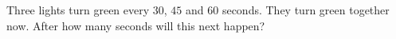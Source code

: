 Three lights turn green every $30$, $45$ and $60$ seconds. They turn green together now. After how many seconds will this next happen?
